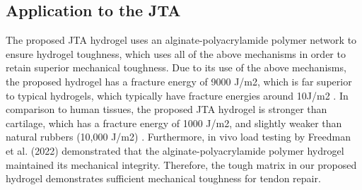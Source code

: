 \subsection{Application to the JTA}
The proposed JTA hydrogel uses an alginate-polyacrylamide polymer network to ensure hydrogel toughness, which uses all of the above mechanisms in order to retain superior mechanical toughness. Due to its use of the above mechanisms, the proposed hydrogel has a fracture energy of 9000 J/m2, which is far superior to typical hydrogels, which typically have fracture energies around 10J/m2 . In comparison to human tissues, the proposed JTA hydrogel is stronger than cartilage, which has a fracture energy of 1000 J/m2, and slightly weaker than natural rubbers (10,000 J/m2) \autocite{sun_highly_2012}. Furthermore, in vivo load testing by Freedman et al. (2022) demonstrated that the alginate-polyacrylamide polymer hydrogel maintained its mechanical integrity. Therefore, the tough matrix in our proposed hydrogel demonstrates sufficient mechanical toughness for tendon repair.
